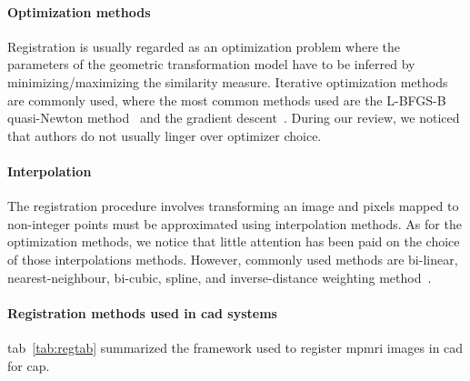 \paragraph{Optimization methods}
Registration is usually regarded as an optimization problem where the parameters of the geometric transformation model have to be inferred by minimizing/maximizing the similarity measure.
Iterative optimization methods are commonly used, where the most common methods used are the L-BFGS-B quasi-Newton method~\cite{Byrd1995} and the gradient descent~\cite{Viola1997}.
During our review, we noticed that authors do not usually linger over optimizer choice.

\paragraph{Interpolation} 
The registration procedure involves transforming an image and pixels mapped to non-integer points must be approximated using interpolation methods.
As for the optimization methods, we notice that little attention has been paid on the choice of those interpolations methods.
However, commonly used methods are bi-linear, nearest-neighbour, bi-cubic, spline, and inverse-distance weighting method~\cite{Mitra2012}.

\paragraph{Registration methods used in \ac{cad} systems}
\acs{tab}~\ref{tab:regtab} summarized the framework used to register \ac{mpmri} images in \ac{cad} for \ac{cap}.

